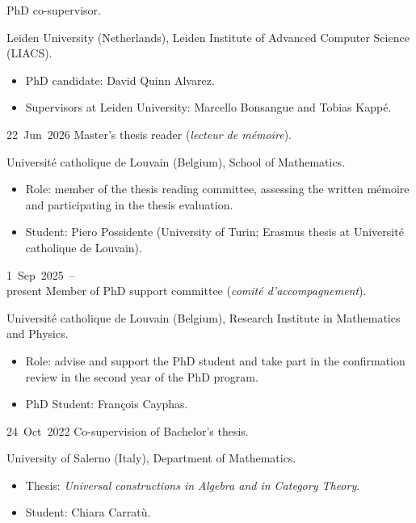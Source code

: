 

\chronorow
  {}
  {PhD co-supervisor.}
  {\textcolor{secondary}{Leiden University (Netherlands), Leiden Institute of Advanced Computer Science
   (LIACS).}
   \begin{itemize}
     \item PhD candidate: David Quinn Alvarez.
     \item Supervisors at Leiden University: Marcello Bonsangue and Tobias Kappé.
   \end{itemize}}

\chronorow
  {22~Jun~2026}
  {Master's thesis reader (\emph{lecteur de mémoire}).}
  {\textcolor{secondary}{Université catholique de Louvain (Belgium), School of Mathematics.}
   \begin{itemize}
     \item Role: member of the thesis reading committee, assessing the written mémoire and participating in
       the thesis evaluation.
     \item Student: Piero Possidente (University of Turin; Erasmus thesis at Université catholique de
       Louvain).
   \end{itemize}}

\chronorow
  {1~Sep~2025~--\\present}
  {Member of PhD support committee (\emph{comité d’accompagnement}).}
  {\textcolor{secondary}{Université catholique de Louvain (Belgium), Research Institute in Mathematics and
   Physics.}
   \begin{itemize}
     \item Role: advise and support the PhD student and take part in the confirmation review in the second
       year of the PhD program.
     \item PhD Student: François Cayphas.
   \end{itemize}}

\chronorow
  {24~Oct~2022}
  {Co-supervision of Bachelor's thesis.}
  {\textcolor{secondary}{University of Salerno (Italy), Department of Mathematics.}
   \begin{itemize}
     \item Thesis: \emph{Universal constructions in Algebra and in Category Theory}.
     \item Student: Chiara Carratù.
   \end{itemize}}


